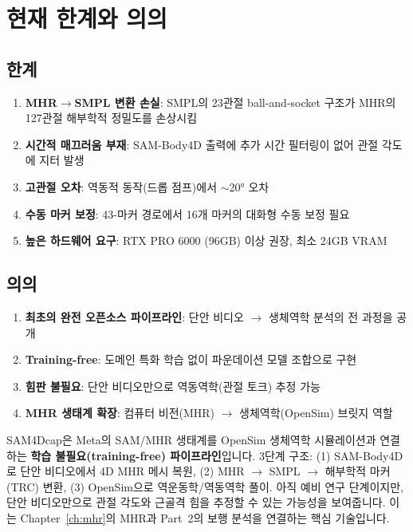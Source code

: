 \documentclass[11pt, a4paper]{report}
\begin{document}
\section{현재 한계와 의의}

\subsection{한계}

\begin{enumerate}[leftmargin=*]
  \item \textbf{MHR$\to$SMPL 변환 손실}: SMPL의 23관절 ball-and-socket 구조가 MHR의 127관절 해부학적 정밀도를 손상시킴
  \item \textbf{시간적 매끄러움 부재}: SAM-Body4D 출력에 추가 시간 필터링이 없어 관절 각도에 지터 발생
  \item \textbf{고관절 오차}: 역동적 동작(드롭 점프)에서 $\sim$20° 오차
  \item \textbf{수동 마커 보정}: 43-마커 경로에서 16개 마커의 대화형 수동 보정 필요
  \item \textbf{높은 하드웨어 요구}: RTX PRO 6000 (96GB) 이상 권장, 최소 24GB VRAM
\end{enumerate}

\subsection{의의}

\begin{enumerate}[leftmargin=*]
  \item \textbf{최초의 완전 오픈소스 파이프라인}: 단안 비디오 $\to$ 생체역학 분석의 전 과정을 공개
  \item \textbf{Training-free}: 도메인 특화 학습 없이 파운데이션 모델 조합으로 구현
  \item \textbf{힘판 불필요}: 단안 비디오만으로 역동역학(관절 토크) 추정 가능
  \item \textbf{MHR 생태계 확장}: 컴퓨터 비전(MHR) $\to$ 생체역학(OpenSim) 브릿지 역할
\end{enumerate}

\begin{summary}
SAM4Dcap은 Meta의 SAM/MHR 생태계를 OpenSim 생체역학 시뮬레이션과 연결하는 \textbf{학습 불필요(training-free) 파이프라인}입니다. 3단계 구조: (1) SAM-Body4D로 단안 비디오에서 4D MHR 메시 복원, (2) MHR $\to$ SMPL $\to$ 해부학적 마커(TRC) 변환, (3) OpenSim으로 역운동학/역동역학 풀이. 아직 예비 연구 단계이지만, 단안 비디오만으로 관절 각도와 근골격 힘을 추정할 수 있는 가능성을 보여줍니다. 이는 Chapter~\ref{ch:mhr}의 MHR과 Part~2의 보행 분석을 연결하는 핵심 기술입니다.
\end{summary}
\end{document}
